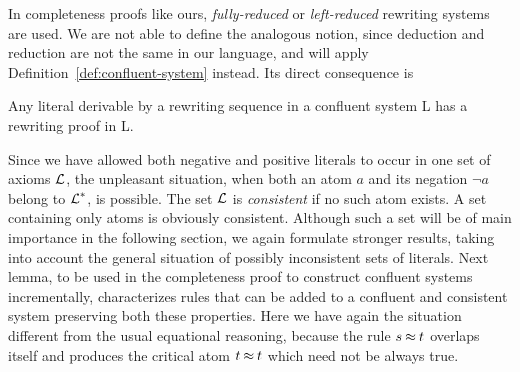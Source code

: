 In completeness proofs like ours, {\em fully-reduced} \cite{PP} or {\em
left-reduced} \cite{S-A,BG} rewriting systems are used.  We are not able to
define the analogous notion, since deduction and reduction 
are not the same in our language, and will apply
Definition~\ref{def:confluent-system} instead. Its direct consequence is
\begin{LEMMA} \label{le:proofs-in-confluent}
Any literal derivable by a rewriting sequence in a confluent system \C L has
a rewriting proof in \C L.
\end{LEMMA}
%

Since we have allowed both negative and positive literals to occur in 
one set of axioms $\mbox {$\cal L$}$,  the 
unpleasant situation, when both an atom $a$ and its negation $\neg a$ 
belong to
$\mbox {$\cal L$}^\ast$, is possible. The set $\mbox {$\cal L$}$ is {\em consistent} if no such 
atom 
exists. A set containing only atoms is obviously consistent. 
Although such a set will be of main importance in the following section,
we again formulate stronger results, 
taking into account the general situation of possibly inconsistent
sets of literals.
Next lemma, to be used in the completeness proof to construct confluent 
systems incrementally, characterizes rules that can be added to 
a confluent and consistent system preserving both these properties.
Here we  have again the situation different  from the usual 
equational reasoning, because
the rule \(s\mathbin{\approx} t\) overlaps itself and produces the critical atom \(t \mathbin{\approx} t\) 
which need not be always true. 

